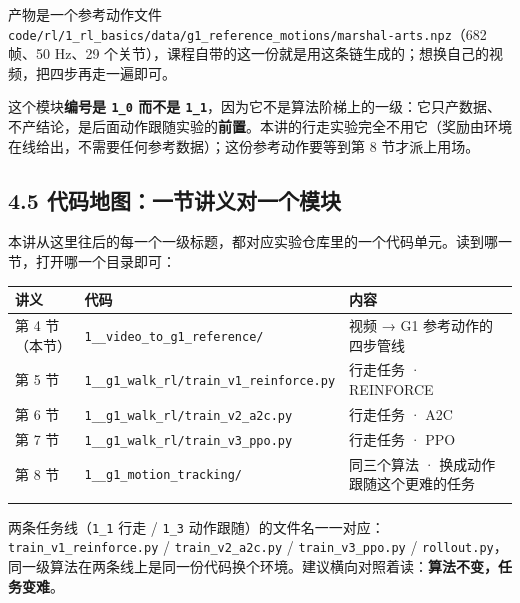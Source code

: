 \documentclass[
  chinese,
]{ctexart}
\begin{document}
产物是一个参考动作文件
\texttt{code/rl/1\_rl\_basics/data/g1\_reference\_motions/marshal-arts.npz}（682
帧、50 Hz、29
个关节），课程自带的这一份就是用这条链生成的；想换自己的视频，把四步再走一遍即可。

这个模块\textbf{编号是 \texttt{1\_0} 而不是
\texttt{1\_1}}，因为它不是算法阶梯上的一级：它只产数据、不产结论，是后面动作跟随实验的\textbf{前置}。本讲的行走实验完全不用它（奖励由环境在线给出，不需要任何参考数据）；这份参考动作要等到第
8 节才派上用场。

\subsection{4.5
代码地图：一节讲义对一个模块}\label{ux4ee3ux7801ux5730ux56feux4e00ux8282ux8bb2ux4e49ux5bf9ux4e00ux4e2aux6a21ux5757}

本讲从这里往后的每一个一级标题，都对应实验仓库里的一个代码单元。读到哪一节，打开哪一个目录即可：

\begin{center}
\begin{tabular}{@{}>{\raggedright\arraybackslash}p{} >{\raggedright\arraybackslash}p{} >{\raggedright\arraybackslash}p{}@{}}
\toprule\noalign{}
讲义 & 代码 & 内容 \\
\midrule\noalign{}
第 4 节（本节） & \texttt{1\_\allowbreak 0\_\allowbreak video\_\allowbreak to\_\allowbreak g1\_\allowbreak reference/} & 视频 → G1 参考动作的四步管线 \\
第 5 节 & \texttt{1\_\allowbreak 1\_\allowbreak g1\_\allowbreak walk\_\allowbreak rl/train\_\allowbreak v1\_\allowbreak reinforce.py} & 行走任务 · REINFORCE \\
第 6 节 & \texttt{1\_\allowbreak 1\_\allowbreak g1\_\allowbreak walk\_\allowbreak rl/train\_\allowbreak v2\_\allowbreak a2c.py} & 行走任务 · A2C \\
第 7 节 & \texttt{1\_\allowbreak 1\_\allowbreak g1\_\allowbreak walk\_\allowbreak rl/train\_\allowbreak v3\_\allowbreak ppo.py} & 行走任务 · PPO \\
第 8 节 & \texttt{1\_\allowbreak 3\_\allowbreak g1\_\allowbreak motion\_\allowbreak tracking/} & 同三个算法 · 换成动作跟随这个更难的任务 \\
\bottomrule\noalign{}
\end{tabular}
\end{center}

两条任务线（\texttt{1\_1} 行走 / \texttt{1\_3}
动作跟随）的文件名一一对应：\texttt{train\_v1\_reinforce.py} /
\texttt{train\_v2\_a2c.py} / \texttt{train\_v3\_ppo.py} /
\texttt{rollout.py}，同一级算法在两条线上是同一份代码换个环境。建议横向对照着读：\textbf{算法不变，任务变难}。
\end{document}
